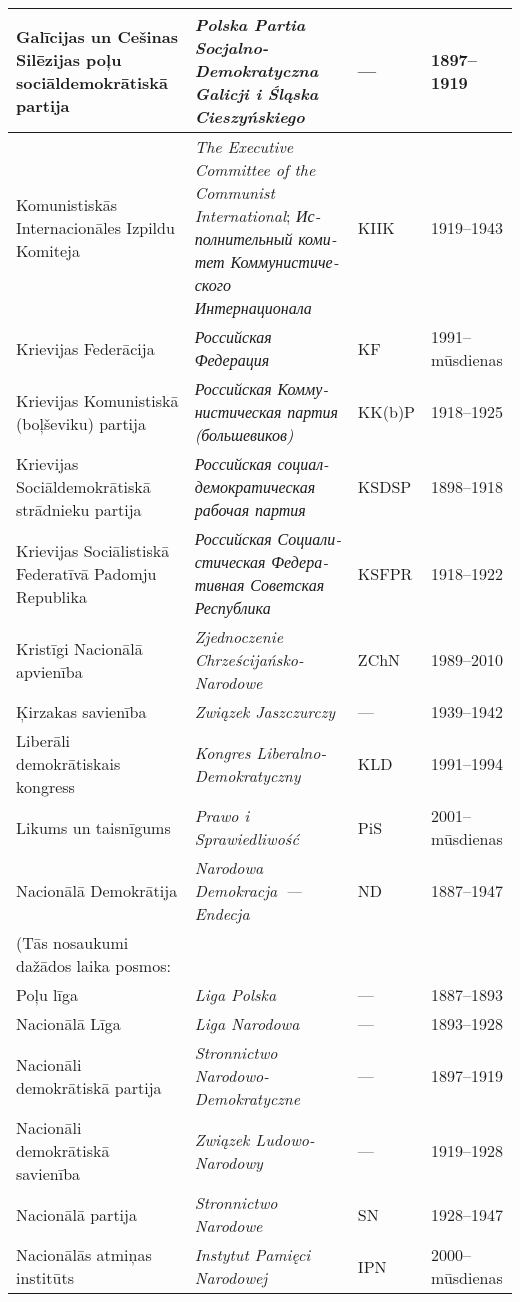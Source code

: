 \documentclass[twoside,a5paper,12pt,fleqn,openany]{extbook}
\newcommand{\pltxti}[1]{\textit{\textpolish{#1}}}
\newcommand{\rutxti}[1]{\textit{\textrussian{#1}}}
\newcommand{\entxti}[1]{\textit{\textenglish{#1}}}
\begin{document}
\begin{footnotesize}
\begin{tabularx}{\linewidth}{|p{3cm}|p{3.5cm}|p{1.4cm}|p{1.6cm}|}
\hline
Galīcijas un Cešinas Silēzijas poļu sociāldemokrātiskā partija & \pltxti{Polska Partia Socjalno-Demokratyczna Galicji i Śląska Cieszyńskiego} & --- & 1897--1919 \\
\hline
Komunistiskās Internacionāles Izpildu Komiteja & \entxti{The Executive Committee of the Communist International}; \rutxti{Исполнительный комитет Коммунистического Интернационала} & KIIK & 1919--1943 \\
\hline
Krievijas Federācija & \rutxti{Российская Федерация} & KF & 1991--mūsdienas \\
\hline
Krievijas Komunistiskā (boļševiku) partija & \rutxti{Российская Коммунистическая партия (большевиков)} & KK(b)P & 1918--1925 \\
\hline
Krievijas Sociāldemokrātiskā strādnieku partija & \rutxti{Российская социал-демократическая рабочая партия} & KSDSP & 1898--1918 \\
\hline
Krievijas Sociālistiskā Federatīvā Padomju Republika & \rutxti{Российская Социалистическая Федеративная Советская Республика} & KSFPR & 1918--1922 \\
\hline
Kristīgi Nacionālā apvienība & \pltxti{Zjednoczenie Chrześcijańsko-Narodowe} & ZChN & 1989--2010 \\
\hline
Ķirzakas savienība & \pltxti{Związek Jaszczurczy} & --- & 1939--1942 \\
\hline
Liberāli demokrātiskais kongress & \pltxti{Kongres Liberalno-Demokratyczny} & KLD & 1991--1994 \\
\hline
Likums un taisnīgums & \pltxti{Prawo i Sprawiedliwość} & PiS & 2001--mūsdienas \\
\hline
Nacionālā Demokrātija & \pltxti{Narodowa Demokracja~--- Endecja} & ND & 1887--1947 \\
(Tās nosaukumi dažādos laika posmos: & ~ & ~ & ~ \\
Poļu līga & \pltxti{Liga Polska} & --- & 1887--1893 \\
Nacionālā Līga & \pltxti{Liga Narodowa} & --- & 1893--1928 \\
Nacionāli demokrātiskā partija & \pltxti{Stronnictwo Narodowo-Demokratyczne} & --- & 1897--1919 \\
Nacionāli demokrātiskā savienība & \pltxti{Związek Ludowo-Narodowy} & --- & 1919--1928 \\
Nacionālā partija & \pltxti{Stronnictwo Narodowe} & SN & 1928--1947 \\
\hline
Nacionālās atmiņas institūts & \pltxti{Instytut Pamięci Narodowej} & IPN & 2000--mūsdienas \\

\end{tabularx}
\end{footnotesize}
\end{document}
